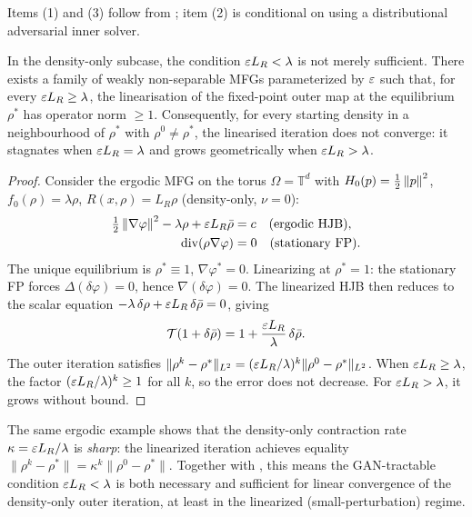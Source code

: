 Items (1) and (3) follow from ; item (2) is conditional on using
a distributional adversarial inner solver.

\begin{proposition}
\label{prop:necessity}
In the density-only subcase, the condition $\varepsilon L_R < \lambda$ is not merely
sufficient.  There exists a family of weakly non-separable MFGs parameterized by
$\varepsilon$ such that, for every $\varepsilon L_R \geq \lambda$, the linearisation
of the fixed-point outer map at the equilibrium $\rho^*$
has operator norm $\geq 1$.
Consequently, for every starting density in a neighbourhood of $\rho^*$
with $\rho^0 \neq \rho^*$, the linearised iteration does not converge:
it stagnates when $\varepsilon L_R = \lambda$ and grows geometrically when
$\varepsilon L_R > \lambda$.
\end{proposition}
\begin{proof}
Consider the ergodic MFG on the torus $\Omega = \mathbb{T}^d$ with
$H_0(p) = \tfrac{1}{2}\left\lVert p \right\rVert^2$, $f_0(\rho) = \lambda\rho$,
$R(x,\rho) = L_R\rho$ (density-only, $\nu = 0$):
\begin{align*}
  \tfrac{1}{2}\left\lVert \nabla\varphi \right\rVert^2 - \lambda\rho + \varepsilon L_R\bar\rho &= c
  \quad\text{(ergodic HJB)},\\
  \operatorname{div}(\rho\nabla\varphi) &= 0
  \quad\text{(stationary FP)}.
\end{align*}
The unique equilibrium is $\rho^* \equiv 1$, $\nabla\varphi^* = 0$.
Linearizing at $\rho^* = 1$: the stationary FP forces
$\Delta(\delta\varphi) = 0$, hence $\nabla(\delta\varphi) = 0$.
The linearized HJB then reduces to the scalar equation
$-\lambda\,\delta\rho + \varepsilon L_R\,\delta\bar\rho = 0$, giving
\[
  \mathcal{T}(1 + \delta\bar\rho) = 1 + \frac{\varepsilon L_R}{\lambda}\,\delta\bar\rho.
\]
The outer iteration satisfies
$\|\rho^k - \rho^*\|_{L^2} = (\varepsilon L_R/\lambda)^k\|\rho^0 - \rho^*\|_{L^2}$.
When $\varepsilon L_R \geq \lambda$, the factor $(\varepsilon L_R/\lambda)^k \geq 1$
for all $k$, so the error does not decrease.
For $\varepsilon L_R > \lambda$, it grows without bound.
\end{proof}

\begin{remark}
The same ergodic example shows that the density-only contraction rate
$\kappa = \varepsilon L_R/\lambda$ is \emph{sharp}: the linearized iteration achieves
equality $\|\rho^k - \rho^*\| = \kappa^k\|\rho^0 - \rho^*\|$.
Together with , this means the GAN-tractable condition
$\varepsilon L_R < \lambda$ is both necessary and sufficient for linear convergence
of the density-only outer iteration, at least in the linearized
(small-perturbation) regime.
\end{remark}
